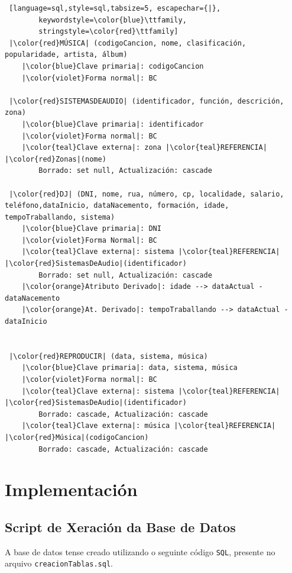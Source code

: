 \documentclass[12pt,a4paper]{book}
\theoremstyle{definition}
\theoremstyle{break}
\begin{document}
\begin{lstlisting} [language=sql,style=sql,tabsize=5, escapechar={|},
		keywordstyle=\color{blue}\ttfamily,
		stringstyle=\color{red}\ttfamily]
 |\color{red}MÚSICA| (codigoCancion, nome, clasificación, popularidade, artista, álbum)
	|\color{blue}Clave primaria|: codigoCancion
	|\color{violet}Forma normal|: BC
		
 |\color{red}SISTEMASDEAUDIO| (identificador, función, descrición, zona)
	|\color{blue}Clave primaria|: identificador
	|\color{violet}Forma normal|: BC
	|\color{teal}Clave externa|: zona |\color{teal}REFERENCIA| |\color{red}Zonas|(nome)
		Borrado: set null, Actualización: cascade
		
 |\color{red}DJ| (DNI, nome, rua, número, cp, localidade, salario, teléfono,dataInicio, dataNacemento, formación, idade, tempoTraballando, sistema)
	|\color{blue}Clave primaria|: DNI
	|\color{violet}Forma Normal|: BC
	|\color{teal}Clave externa|: sistema |\color{teal}REFERENCIA| |\color{red}SistemasDeAudio|(identificador)
		Borrado: set null, Actualización: cascade
	|\color{orange}Atributo Derivado|: idade --> dataActual - dataNacemento
	|\color{orange}At. Derivado|: tempoTraballando --> dataActual - dataInicio
		
		
 |\color{red}REPRODUCIR| (data, sistema, música)
	|\color{blue}Clave primaria|: data, sistema, música
	|\color{violet}Forma normal|: BC
	|\color{teal}Clave externa|: sistema |\color{teal}REFERENCIA| |\color{red}SistemasDeAudio|(identificador)
		Borrado: cascade, Actualización: cascade
	|\color{teal}Clave externa|: música |\color{teal}REFERENCIA| |\color{red}Música|(codigoCancion)
		Borrado: cascade, Actualización: cascade
	\end{lstlisting}
	
	
	\chapter{Implementación}
	\section{Script de Xeración da Base de Datos}
	
	A base de datos tense creado utilizando o seguinte código \texttt{SQL}, presente no arquivo \texttt{creacionTablas.sql}.
	
\end{document}
